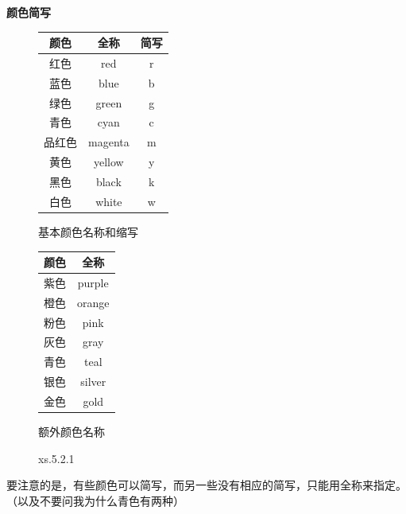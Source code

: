 \documentclass[12pt]{article}
\begin{document}
\noindent\textbf{\large 颜色简写}
\begin{figure}[H]
    \centering
    \begin{subtable}[b]{0.48\textwidth}
        \centering
        \begin{tabular}{@{}ccc@{}}
        \toprule
        颜色 & 全称 & 简写 \\ \midrule
        \multicolumn{1}{|c|}{红色} & \multicolumn{1}{c|}{red} & \multicolumn{1}{c|}{r} \\ \midrule
        \multicolumn{1}{|c|}{蓝色} & \multicolumn{1}{c|}{blue} & \multicolumn{1}{c|}{b} \\ \midrule
        \multicolumn{1}{|c|}{绿色} & \multicolumn{1}{c|}{green} & \multicolumn{1}{c|}{g} \\ \midrule
        \multicolumn{1}{|c|}{青色} & \multicolumn{1}{c|}{cyan} & \multicolumn{1}{c|}{c} \\ \midrule
        \multicolumn{1}{|c|}{品红色} & \multicolumn{1}{c|}{magenta} & \multicolumn{1}{c|}{m} \\ \midrule
        \multicolumn{1}{|c|}{黄色} & \multicolumn{1}{c|}{yellow} & \multicolumn{1}{c|}{y} \\ \midrule
        \multicolumn{1}{|c|}{黑色} & \multicolumn{1}{c|}{black} & \multicolumn{1}{c|}{k} \\ \midrule
        白色 & white & w \\ \bottomrule
        \end{tabular}
        \caption{基本颜色名称和缩写}
    \end{subtable}
    \hfill
    \begin{subtable}[b]{0.48\textwidth}
        \centering
        \begin{tabular}{@{}cc@{}}
        \toprule
        颜色 & 全称 \\ \midrule
        \multicolumn{1}{|c|}{紫色} & \multicolumn{1}{c|}{purple} \\ \midrule
        \multicolumn{1}{|c|}{橙色} & \multicolumn{1}{c|}{orange} \\ \midrule
        \multicolumn{1}{|c|}{粉色} & \multicolumn{1}{c|}{pink} \\ \midrule
        \multicolumn{1}{|c|}{灰色} & \multicolumn{1}{c|}{gray} \\ \midrule
        \multicolumn{1}{|c|}{青色} & \multicolumn{1}{c|}{teal} \\ \midrule
        \multicolumn{1}{|c|}{银色} & \multicolumn{1}{c|}{silver} \\ \midrule
        金色 & gold \\ \bottomrule
        \end{tabular}
        \caption{额外颜色名称}
    \end{subtable}
    \caption{xs.5.2.1}
\end{figure}
要注意的是，有些颜色可以简写，而另一些没有相应的简写，只能用全称来指定。（以及不要问我为什么青色有两种）
\end{document}

